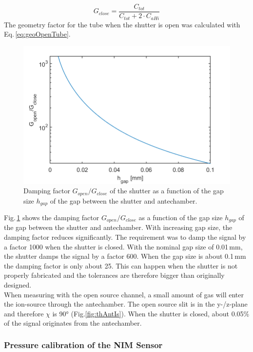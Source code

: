 		\begin{equation}
			G_{close} = \frac{C_{tot}}{C_{tot} + 2\cdot C_{aHi}}
		\end{equation}
		The geometry factor for the tube when the shutter is open was calculated with Eq.\,\eqref{eq:geoOpenTube}.\\
		\begin{figure}[h]
			\centering
			\includegraphics[width=.8\textwidth]{Bilder/ShutGapSizeSigDamp.png}
			\caption{Damping factor $G_{open}/G_{close}$ of the shutter as a function of the gap size $h_{gap}$ of the gap between the shutter and antechamber.}
			\label{fig:ShutGapSizeSigDamp}
		\end{figure}
		Fig.\,\ref{fig:ShutGapSizeSigDamp} shows the damping factor $G_{open}/G_{close}$ as a function of the gap size $h_{gap}$ of the gap between the shutter and antechamber. With increasing gap size, the damping factor reduces significantly. The requirement was to damp the signal by a factor 1000 when the shutter is closed. With the nominal gap size of 0.01\,mm, the shutter damps the signal by a factor 600. When the gap size is about 0.1\,mm the damping factor is only about 25. This can happen when the shutter is not properly fabricated and the tolerances are therefore bigger than originally designed.\\
		When measuring with the open source channel, a small amount of gas will enter the ion-source through the antechamber. The open source slit is in the y-/z-plane and therefore $\chi$ is 90\si{\degree} (Fig.\ref{fig:thAntIs}). When the shutter is closed, about 0.05\% of the signal originates from the antechamber.
		
		\subsubsection{Pressure calibration of the NIM Sensor }
		
